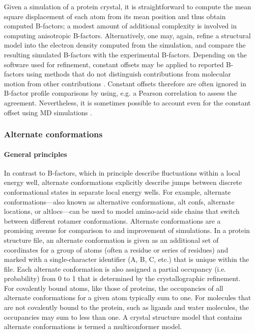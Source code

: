 \documentclass[9pt,review]{livecoms}
\begin{document}
Given a simulation of a protein crystal, it is straightforward to compute the mean square displacement of each atom from its mean position and thus obtain computed B-factors; a modest amount of additional complexity is involved in computing anisotropic B-factors.
Alternatively, one may, again, refine a structural model into the electron density computed from the simulation, and compare the resulting simulated B-factors with the experimental B-factors.
Depending on the software used for refinement, constant offsets may be applied to reported B-factors using methods that do not distinguish contributions from molecular motion from other contributions \cite{liebschner_macromolecular_2019}.
Constant offsets therefore are often ignored in B-factor profile comparisons by using, e.g. a Pearson correlation to assess the agreement. Nevertheless, it is sometimes possible to account even for the constant offset using MD simulations \cite{wall_internal_2018}.

\subsubsection{Alternate conformations}
\label{sub2:alt_confs}

\paragraph{General principles}

In contrast to B-factors, which in principle describe fluctuations within a local energy well, alternate conformations explicitly describe jumps between discrete conformational states in separate local energy wells.
For example, alternate conformations---also known as alternative conformations, alt confs, alternate locations, or altlocs---can be used to model amino-acid side chains that switch between different rotamer \cite{dunbrack_backbone-dependent_1993,lovell_penultimate_2000} conformations.
Alternate conformations are a promising avenue for comparison to and improvement of simulations.
In a protein structure file, an alternate conformation is given as an additional set of coordinates for a group of atoms (often a residue or series of residues) and marked with a single-character identifier (A, B, C, etc.) that is unique within the file.
Each alternate conformation is also assigned a partial occupancy (i.e. probability) from 0 to 1 that is determined by the crystallographic refinement.
For covalently bound atoms, like those of proteins, the occupancies of all alternate conformations for a given atom typically sum to one.
For molecules that are not covalently bound to the protein, such as ligands and water molecules, the occupancies may sum to less than one.
A crystal structure model that contains alternate conformations is termed a multiconformer model.
\end{document}
